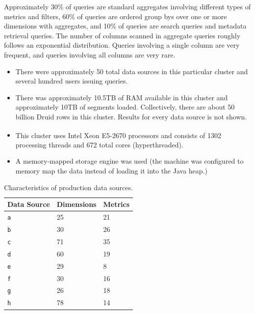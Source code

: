 \documentclass{vldb}
\begin{document}
Approximately 30\% of queries are standard aggregates involving different types
of metrics and filters, 60\% of queries are ordered group bys over one or more
dimensions with aggregates, and 10\% of queries are search queries and metadata
retrieval queries. The number of columns scanned in aggregate queries roughly
follows an exponential distribution. Queries involving a single column are very
frequent, and queries involving all columns are very rare.

\begin{itemize}[leftmargin=*,beginpenalty=5000,topsep=0pt]
\item There were
approximately 50 total data sources in this particular cluster and several hundred users issuing
queries.

\item There was approximately 10.5TB of RAM available in this cluster and
approximately 10TB of segments loaded. Collectively,
there are about 50 billion Druid rows in this cluster. Results for
every data source is not shown.

\item This cluster uses Intel\textsuperscript{\textregistered} Xeon\textsuperscript{\textregistered} E5-2670 processors and consists of 1302 processing
threads and 672 total cores (hyperthreaded).

\item A memory-mapped storage engine was used (the machine was configured to
    memory map the data instead of loading it into the Java heap.)
\end{itemize}

\begin{table}
  \centering
  \scriptsize\begin{tabular}{| l | l | l |}
    \hline
    \textbf{Data Source} & \textbf{Dimensions} & \textbf{Metrics} \\ \hline
    \texttt{a} & 25 & 21 \\ \hline
    \texttt{b} & 30 & 26 \\ \hline
    \texttt{c} & 71 & 35 \\ \hline
    \texttt{d} & 60 & 19 \\ \hline
    \texttt{e} & 29 & 8 \\ \hline
    \texttt{f} & 30 & 16 \\ \hline
    \texttt{g} & 26 & 18 \\ \hline
    \texttt{h} & 78 & 14 \\ \hline
  \end{tabular}
  \normalsize
  \caption{Characteristics of production data sources.}
  \label{tab:datasources}
\end{table}
\end{document}
